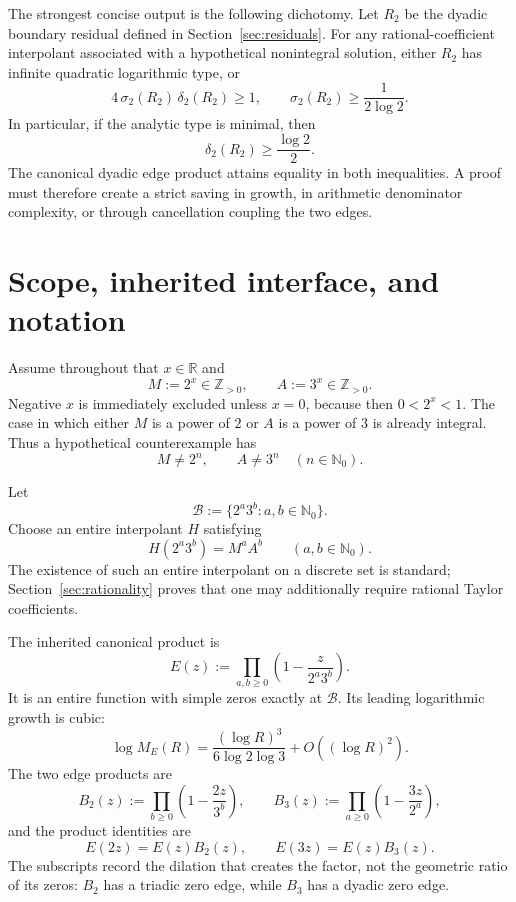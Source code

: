 \documentclass[11pt]{article}
\theoremstyle{definition}
\newcommand{\Z}{\mathbb Z}
\newcommand{\Nzero}{\mathbb N_0}
\newcommand{\cB}{\mathcal B}
\begin{document}
The strongest concise output is the following dichotomy.  Let \(R_2\) be the dyadic boundary residual defined in Section~\ref{sec:residuals}.  For any rational-coefficient interpolant associated with a hypothetical nonintegral solution, either \(R_2\) has infinite quadratic logarithmic type, or
\[
  4\,\sigma_2(R_2)\,\delta_2(R_2)\ge 1,
  \qquad
  \sigma_2(R_2)\ge \frac{1}{2\log 2}.
\]
In particular, if the analytic type is minimal, then
\[
  \delta_2(R_2)\ge \frac{\log 2}{2}.
\]
The canonical dyadic edge product attains equality in both inequalities.  A proof must therefore create a strict saving in growth, in arithmetic denominator complexity, or through cancellation coupling the two edges.

\section{Scope, inherited interface, and notation}

Assume throughout that \(x\in\mathbb R\) and
\[
  M:=2^x\in\Z_{>0},
  \qquad
  A:=3^x\in\Z_{>0}.
\]
Negative \(x\) is immediately excluded unless \(x=0\), because then \(0<2^x<1\).  The case in which either \(M\) is a power of \(2\) or \(A\) is a power of \(3\) is already integral.  Thus a hypothetical counterexample has
\[
  M\ne 2^n,
  \qquad
  A\ne 3^n
  \quad(n\in\Nzero).
\]

Let
\[
  \cB:=\{2^a3^b:a,b\in\Nzero\}.
\]
Choose an entire interpolant \(H\) satisfying
\begin{equation}\label{eq:interpolation-data}
  H(2^a3^b)=M^aA^b
  \qquad(a,b\in\Nzero).
\end{equation}
The existence of such an entire interpolant on a discrete set is standard; Section~\ref{sec:rationality} proves that one may additionally require rational Taylor coefficients.

The inherited canonical product is
\begin{equation}\label{eq:E-product}
  E(z):=\prod_{a,b\ge0}\left(1-\frac{z}{2^a3^b}\right).
\end{equation}
It is an entire function with simple zeros exactly at \(\cB\).  Its leading logarithmic growth is cubic:
\[
  \log M_E(R)
   =\frac{(\log R)^3}{6\log2\log3}+O((\log R)^2).
\]
The two edge products are
\begin{equation}\label{eq:edge-products}
  B_2(z):=\prod_{b\ge0}\left(1-\frac{2z}{3^b}\right),
  \qquad
  B_3(z):=\prod_{a\ge0}\left(1-\frac{3z}{2^a}\right),
\end{equation}
and the product identities are
\begin{equation}\label{eq:E-dilations}
  E(2z)=E(z)B_2(z),
  \qquad
  E(3z)=E(z)B_3(z).
\end{equation}
The subscripts record the dilation that creates the factor, not the geometric ratio of its zeros: \(B_2\) has a triadic zero edge, while \(B_3\) has a dyadic zero edge.
\end{document}
